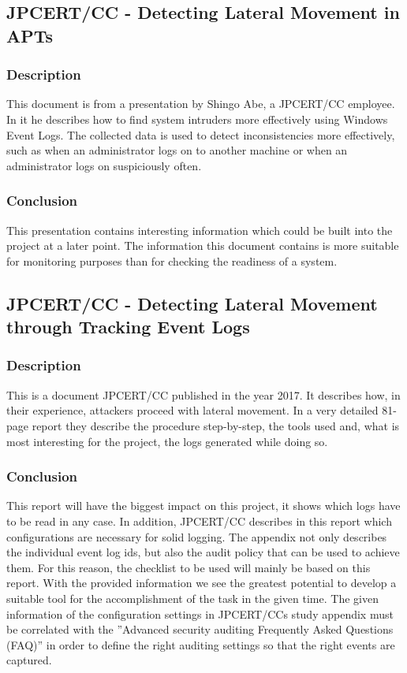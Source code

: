 \subsection{JPCERT/CC - Detecting Lateral Movement in APTs} \label{DetectingLateral}
\subsubsection{Description}
This document \cite{Abe2016} is from a presentation by Shingo Abe, a JPCERT/CC employee. In it he describes how to find system intruders more effectively using Windows Event Logs. The collected data is used to detect inconsistencies more effectively, such as when an administrator logs on to another machine or when an administrator logs on suspiciously often. 
\subsubsection{Conclusion}
This presentation contains interesting information which could be built into the project at a later point. The information this document contains is more suitable for monitoring purposes than for checking the readiness of a system.

\subsection{JPCERT/CC - Detecting Lateral Movement through Tracking Event Logs}\label{JPCertStudy}
\subsubsection{Description}
This is a document \cite{JPCERTDetectingLateralMovement} JPCERT/CC published in the year 2017. It describes how, in their experience, attackers proceed with lateral movement. In a very detailed 81-page report they describe the procedure step-by-step, the tools used and, what is most interesting for the project, the logs generated while doing so.
\subsubsection{Conclusion}
This report will have the biggest impact on this project, it shows which logs have to be read in any case. In addition, JPCERT/CC describes in this report which configurations are necessary for solid logging. The appendix not only describes the individual event log ids, but also the audit policy that can be used to achieve them. For this reason, the checklist to be used will mainly be based on this report. With the provided information we see the greatest potential to develop a suitable tool for the accomplishment of the task in the given time. The given information of the configuration settings in JPCERT/CCs study appendix must be correlated with the ''Advanced security auditing Frequently Asked Questions (FAQ)'' \cite{AdvancedSecurityAuditing} in order to define the right auditing settings so that the right events are captured.

